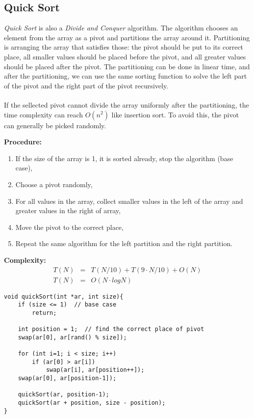 \documentclass[12pt]{article}
\begin{document}
\cleardoublepage
    \subsection{Quick Sort}
		
\textit{Quick Sort} is also a \textit{Divide and Conquer} algorithm. The algorithm chooses an element from the array as a pivot and partitions the array around it. Partitioning is arranging the array that satisfies those: the pivot should be put to its correct place, all smaller values should be placed before the pivot, and all greater values should be placed after the pivot. The partitioning can be done in linear time, and after the partitioning, we can use the same sorting function to solve the left part of the pivot and the right part of the pivot recursively. \\ \\
If the sellected pivot cannot divide the array uniformly after the partitioning, the time complexity can reach $O(n ^ 2)$ like insertion sort. To avoid this, the pivot can generally be picked randomly.

\textbf{Procedure: }
\begin{enumerate}
	\item If the size of the array is 1, it is sorted already, stop the algorithm (base case),
	\item Choose a pivot randomly,
	\item For all values in the array, collect smaller values in the left of the array and greater values in the right of array,
	\item Move the pivot to the correct place,
	\item Repeat the same algorithm for the left partition and the right partition.
\end{enumerate}	

\textbf{Complexity: }
\begin{eqnarray*}
	T(N) &=& T(N / 10) + T(9\cdot N / 10) + O(N) \\
	T(N) &=& O(N \cdot logN)
\end{eqnarray*}
		
\begin{verbatim}
void quickSort(int *ar, int size){
    if (size <= 1)  // base case
        return;
	
    int position = 1;  // find the correct place of pivot
    swap(ar[0], ar[rand() % size]);
	
    for (int i=1; i < size; i++)
        if (ar[0] > ar[i])
            swap(ar[i], ar[position++]);
    swap(ar[0], ar[position-1]);
	
    quickSort(ar, position-1);
    quickSort(ar + position, size - position);
}
\end{verbatim}
\end{document}
